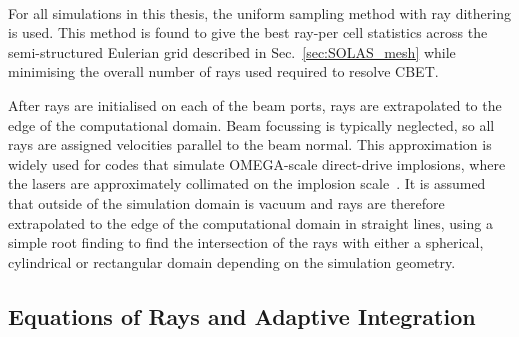 \paragraph*{}
For all simulations in this thesis, the uniform sampling method with ray dithering is used.
This method is found to give the best ray-per cell statistics across the semi-structured Eulerian grid described in Sec.~\ref{sec:SOLAS_mesh} while minimising the overall number of rays used required to resolve \ac{CBET}.

After rays are initialised on each of the beam ports, rays are extrapolated to the edge of the computational domain.
Beam focussing is typically neglected, so all rays are assigned velocities parallel to the beam normal.
This approximation is widely used for codes that simulate OMEGA-scale direct-drive implosions, where the lasers are approximately collimated on the implosion scale~\cite{colaitis_inverse_2021,marozas_wavelength-detuning_2018}.
It is assumed that outside of the simulation domain is vacuum and rays are therefore extrapolated to the edge of the computational domain in straight lines, using a simple root finding to find the intersection of the rays with either a spherical, cylindrical or rectangular domain depending on the simulation geometry.

\subsection{Equations of Rays and Adaptive Integration}%
\label{sec:SOLAS_ray_propagation}

